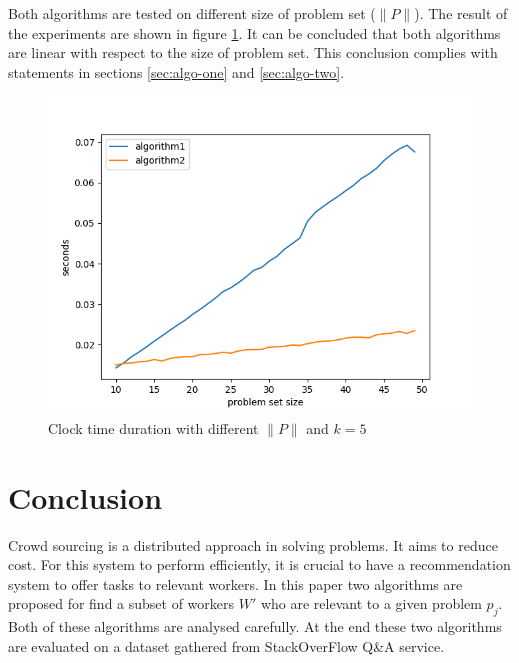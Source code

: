 \documentclass{template}
\begin{document}
Both algorithms are tested on different size of problem set (\(\lVert P \rVert\)). The result
of the experiments are shown in figure \ref{fig:p-comparison}. It can be concluded that both 
algorithms are linear with respect to the size of problem set. This conclusion complies with
statements in sections \ref{sec:algo-one} and \ref{sec:algo-two}.

\begin{figure}
    \includegraphics[width=\linewidth]{./images/algo1_algo2_diff_p.png}
    \caption{Clock time duration with different \(\lVert P \rVert\) and \(k=5\)}
    \label{fig:p-comparison}
\end{figure}


\section{Conclusion}
\label{sec:conclusion}
Crowd sourcing is a distributed approach in solving problems. It aims to reduce cost.
For this system to perform efficiently, it is crucial to have a recommendation system
to offer tasks to relevant workers.
In this paper two algorithms are proposed for find a subset of workers \(W'\) who
are relevant to a given problem \(p_j\). Both of these algorithms are analysed carefully.
At the end these two algorithms are evaluated on a dataset gathered from StackOverFlow 
Q\&A service.
\end{document}
